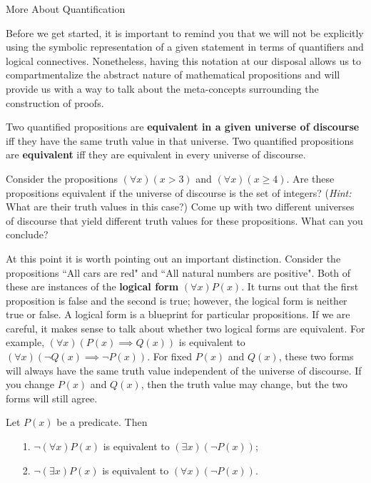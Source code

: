 \begin{section}{More About Quantification}

Before we get started, it is important to remind you that we will not be explicitly using the symbolic representation of a given statement in terms of quantifiers and logical connectives.  Nonetheless, having this notation at our disposal allows us to compartmentalize the abstract nature of mathematical propositions and will provide us with a way to talk about the meta-concepts surrounding the construction of proofs.

\begin{definition}
Two quantified propositions are \textbf{equivalent in a given universe of discourse} iff they have the same truth value in that universe.  Two quantified propositions are \textbf{equivalent} iff they are equivalent in every universe of discourse.
\end{definition}

\begin{exercise}
Consider the propositions $(\forall x)(x>3)$ and $(\forall x)(x\geq 4)$.  Are these propositions equivalent if the universe of discourse is the set of integers?  (\emph{Hint:}  What are their truth values in this case?)  Come up with two different universes of discourse that yield different truth values for these propositions.  What can you conclude?
\end{exercise}

\begin{remark}
At this point it is worth pointing out an important distinction.  Consider the propositions ``All cars are red" and ``All natural numbers are positive".  Both of these are instances of the \textbf{logical form} $(\forall x)P(x)$.  It turns out that the first proposition is false and the second is true; however, the logical form is neither true or false.  A logical form is a blueprint for particular propositions.  If we are careful, it makes sense to talk about whether two logical forms are equivalent.  For example, $(\forall x)(P(x)\implies Q(x))$ is equivalent to $(\forall x)(\neg Q(x)\implies \neg P(x))$.  For fixed $P(x)$ and $Q(x)$, these two forms will always have the same truth value independent of the universe of discourse.  If you change $P(x)$ and $Q(x)$, then the truth value may change, but the two forms will still agree.
\end{remark}

\begin{theorem}\label{thm:negation of quantifiers}
Let $P(x)$ be a predicate.  Then
\begin{enumerate}
\item[1.] $\neg (\forall x)P(x)$ is equivalent to $(\exists x)(\neg P(x))$;
\item[2.] $\neg (\exists x)P(x)$ is equivalent to $(\forall x)(\neg P(x))$.
\end{enumerate}
\end{theorem}


\end{section}
